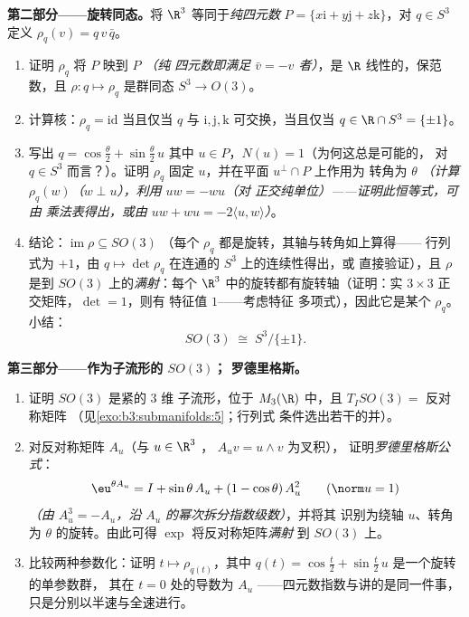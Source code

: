 \begin{problem}
\medskip
\noindent\textbf{第二部分——旋转同态。}将
$\R^3$ 等同于\emph{纯四元数} $P = \{x\mathrm i +
y\mathrm j + z\mathrm k\}$，对 $q \in S^3$ 定义
$\rho_q(v) = q\,v\,\bar q$。
\begin{enumerate}[resume]
  \item 证明 $\rho_q$ 将 $P$ 映到 $P$ \emph{（纯
        四元数即满足 $\bar v = -v$ 者）}，是
        $\R$ 线性的，保范数，且 $\rho
        \colon q \mapsto \rho_q$ 是群同态 $S^3
        \to O(3)$。
  \item 计算核：$\rho_q = \mathrm{id}$ 当且仅当 $q$
        与 $\mathrm i, \mathrm j, \mathrm k$ 可交换，当且仅当
        $q \in \R\cap S^3 = \{\pm1\}$。
  \item 写出 $q = \cos\frac\theta2 + \sin\frac\theta2\,u$
        其中 $u \in P$，$N(u) = 1$（为何这总是可能的，
        对 $q \in S^3$ 而言？）。证明 $\rho_q$ 固定
        $u$，并在平面 $u^\perp\cap P$ 上作用为
        转角为 $\theta$ \emph{（计算
        $\rho_q(w)$（$w \perp u$），利用 $uw = -wu$（对
        正交纯单位）——证明此恒等式，可由
        乘法表得出，或由 $uw + wu =
        -2\langle u, w\rangle$）}。
  \item 结论：$\operatorname{im}\rho \subseteq SO(3)$
        （每个 $\rho_q$ 都是旋转，其轴与转角如上算得——
        行列式为 $+1$，由 $q
        \mapsto \det\rho_q$ 在连通的 $S^3$ 上的连续性得出，或
        直接验证），且 $\rho$ 是到 $SO(3)$ 上的\emph{满射}：每个
        $\R^3$ 中的旋转都有旋转轴（证明：实
        $3\times3$ 正交矩阵，$\det = 1$，则有
        特征值 $1$——考虑特征
        多项式），因此它是某个 $\rho_q$。小结：
        \[
        SO(3) \;\cong\; S^3/\{\pm 1\} .
        \]
\end{enumerate}

\medskip
\noindent\textbf{第三部分——作为子流形的 $SO(3)$；
罗德里格斯。}
\begin{enumerate}[resume]
  \item 证明 $SO(3)$ 是紧的 $3$ 维
        子流形，位于 $M_3(\R)$ 中，且 $T_ISO(3) =$
        反对称矩阵
        （见\cref{exo:b3:submanifolds:5}；行列式
        条件选出若干的并）。
  \item 对反对称矩阵 $A_u$（与 $u \in \R^3$ ，
        $A_uv = u\wedge v$ 为叉积），
        证明\emph{罗德里格斯公式}：
        \[
        \eu^{\theta A_u} = I + \sin\theta\,A_u + (1 -
        \cos\theta)\,A_u^2 \qquad (\norm u = 1)
        \]
        \emph{（由 $A_u^3 = -A_u$，沿
        $A_u$ 的幂次拆分指数级数）}，并将其
        识别为绕轴 $u$、转角为 $\theta$ 的旋转。由此可得
        $\exp$ 将反对称矩阵\emph{满射}
        到 $SO(3)$ 上。
  \item 比较两种参数化：证明 $t
        \mapsto \rho_{q(t)}$，其中 $q(t) = \cos\frac t2 +
        \sin\frac t2\,u$ 是一个旋转的单参数群，
        其在 $t = 0$ 处的导数为 $A_u$
——四元数指数与讲的是同一件事，
        只是分别以半速与全速进行。
\end{enumerate}


\end{problem}
